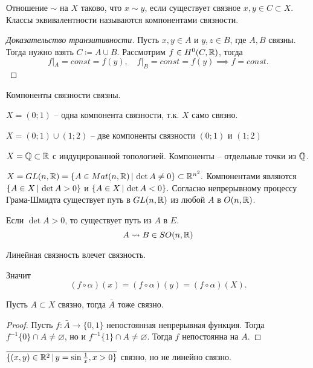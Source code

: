 \begin{definition}
    Отношение $\sim$ на $X$ таково, что $x\sim y$, если существует связное $x,y\in C\subset X.$ Классы эквивалентности называются компонентами связности.
\end{definition}
\begin{proof}[Доказательство транзитивности]
    Пусть $x,y \in A$ и $y, z\in B$, где $A, B$ связны. Тогда нужно взять $C\coloneq A\cup B$. Рассмотрим $f \in H^0(C, \mathbb R)$, тогда \begin{equation}f|_A = const=f(y), \quad f|_B=const=f(y)\implies f = const.\end{equation}  
\end{proof}

\begin{proposition}
    Компоненты связности связны.
\end{proposition}
\begin{example}
    $X = (0;1)$ -- одна компонента связности, т.к. $X$ само связно.
\end{example}
\begin{example}
    $X = (0;1)\cup(1;2)$ -- две компоненты связности $(0;1)$ и $(1;2)$
\end{example}
\begin{example}
    $X=\mathbb Q\subset \mathbb R$ с индуцированной топологией. Компоненты -- отдельные точки из $\mathbb Q$.
\end{example}
\begin{example}
    $X = GL(n, \mathbb R) =\{A \in Mat(n, \mathbb R)\,|\, \det A \neq 0\}\subset \mathbb R^{n^2}.$ Компонентами являются $\{A\in X\,|\, \det A >0\}$ и $\{A\in X\,|\, \det A < 0\}.$ Согласно непрерывному процессу Грама-Шмидта существует путь в $GL(n, \mathbb R)$ из любой $A$ в $O(n, 
    \mathbb R)$. 
\end{example}
\begin{lemma}
    Если $\det A >0$, то существует путь из $A$ в $E$. \[A\leadsto B \in SO(n, \mathbb R)\]
\end{lemma}

\begin{theorem}
    Линейная связность влечет связность.
\end{theorem}
Значит $$(f\circ \alpha)(x)=(f\circ \alpha)(y)=(f\circ \alpha)(X).$$
\begin{theorem}
    Пусть $A\subset X$ связно, тогда $\bar A$ тоже связно.
\end{theorem}
\begin{proof}
    Пусть $f\colon \bar A \to \{0,1\}$ непостоянная непрерывная функция. Тогда $f^{-1}\{0\} \cap A \neq \varnothing$, но и $f^{-1}\{1\}\cap A \neq \varnothing$. Тогда $f$ непостоянна на $A.$ 
\end{proof}
\begin{example}
    $\overline{\{(x,y)\in\mathbb R^2\,|\, y = \sin \frac 1 x, x > 0\}}$ связно, но не линейно связно.
\end{example}

